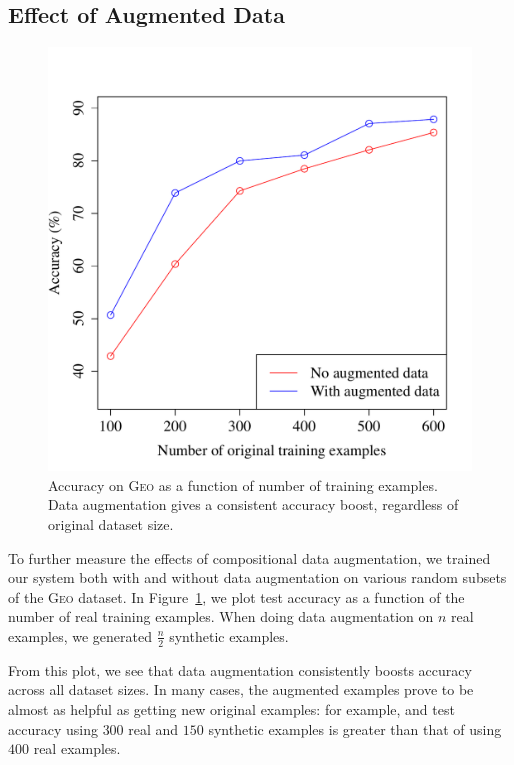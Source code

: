 \documentclass[11pt,letterpaper]{article}
\newcommand{\geo}{\textsc{Geo}\xspace}
\newcommand\rj[1]{}
\begin{document}
\subsection{Effect of Augmented Data}
\begin{figure}[t] 
\small
\begin{center} 
  \includegraphics[scale=0.4]{fig-geo-augment.pdf}
\end{center} 
\caption{Accuracy on \geo as a function of number of training examples.
  Data augmentation gives a consistent accuracy boost,
regardless of original dataset size.}
\label{fig:geo-augment}
\end{figure}
\rj{Rewrote quite a bit here, as I think we maybe shouldn't
  focus so much on directly comparing the value of
real and augmented examples, at least in this subsection}

To further measure the effects of compositional data augmentation,
we trained our system both with and without data augmentation
on various random subsets of the \geo dataset.
In Figure~\ref{fig:geo-augment}, we plot test accuracy as a function of
the number of real training examples.
When doing data augmentation on $n$ real examples,
we generated $\frac{n}2$ synthetic examples.

From this plot, we see that data augmentation consistently boosts accuracy
across all dataset sizes.
In many cases, the augmented examples prove to be
almost as helpful as getting new original examples:
for example,
and test accuracy using $300$ real and $150$ synthetic examples 
is greater than that of using $400$ real examples.
\end{document}
